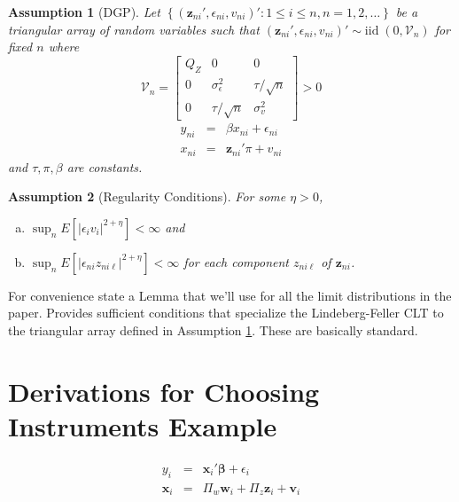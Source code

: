 \documentclass[12pt]{article}\usepackage[]{graphicx}\usepackage[]{color}
\newtheorem{assump}{Assumption}[section]
\theoremstyle{definition}
\begin{document}
\newpage
\begin{assump}[DGP]
\label{assump:local}
  Let $\left\{\left(\mathbf{z}_{ni}', \epsilon_{ni}, v_{ni}\right)'\colon 1\leq i \leq n, n = 1, 2, \hdots\right\}$ be a triangular array of random variables such that $\left(\mathbf{z}_{ni}', \epsilon_{ni}, v_{ni}\right)' \sim \mbox{iid} \;(0, \mathcal{V}_n)$ for fixed $n$ where
		\begin{equation}
		\mathcal{V}_n = \left[ \begin{array}{ccc}
	Q_Z & 0 & 0\\
	0 & \sigma_\epsilon^2 & \tau/\sqrt{n}\\
	0 & \tau/\sqrt{n}& \sigma_v^2
\end{array}	 \right] > 0
		\end{equation}
			\begin{eqnarray}
			y_{ni} &=& \beta x_{ni}  + \epsilon_{ni}\\
	x_{ni} &=& \mathbf{z}_{ni}' \pi + v_{ni}
		\end{eqnarray}
and $\tau,\pi, \beta$ are constants.
\end{assump}


\begin{assump}[Regularity Conditions]
  \label{assump:reg}For some $\eta > 0$,
  \begin{enumerate}[(a)]
		\item $\sup_n E\left[ \lvert\epsilon_iv_i \rvert^{2+\eta}\right]<\infty$ and
		\item $\sup_n E\left[ \lvert \epsilon_{ni} z_{ni\ell} \rvert^{2+\eta} \right]<\infty$ for each component $z_{ni\ell}$ of $\mathbf{z}_{ni}$.
	\end{enumerate}
\end{assump}


For convenience state a Lemma that we'll use for all the limit distributions in the paper. Provides sufficient conditions that specialize the Lindeberg-Feller CLT to the triangular array defined in Assumption \ref{assump:local}. These are basically standard.



\section{Derivations for Choosing Instruments Example}

\begin{eqnarray}
    y_i &=& \mathbf{x}_i' \boldsymbol{\beta} +  \epsilon_i\\
    \mathbf{x}_i &=& \Pi_w \mathbf{w}_i + \Pi_z \mathbf{z}_i + \mathbf{v}_i
\end{eqnarray}
\end{document}

